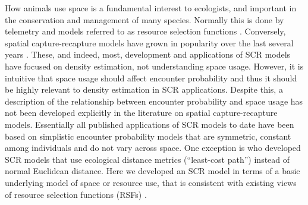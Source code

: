 \documentclass[12pt]{article}
\begin{document}
How animals use space is a fundamental interest to ecologists, and
important in the conservation and management of many species.
Normally this is done
by telemetry and models referred to as resource selection functions
\citep{manly_etal:2002}.  Conversely, spatial capture-recapture models
have grown in popularity over the last several years
\citep{efford:2004,borchers_efford:2008, royle:2008,
  efford_etal:2009ecol,royle_etal:2009ecol, gardner_etal:2010ecol,
  gardner_etal:2010jwm, kery_etal:2010,
  sollmann_etal:2011,mollet_etal:2012,gopalaswamy_etal:2012}. These,
and indeed, most,
 development and applications of SCR models have focused on density
estimation, not understanding space usage.  However, it is intuitive that space
usage should affect encounter probability and thus it should be highly relevant
to density estimation in SCR applications. Despite this, a description
of the
relationship between encounter probability and space usage has not
been developed explicitly in the literature on spatial
capture-recapture models.  Essentially all
published applications of SCR models to date have been based on
simplistic encounter probability models that are symmetric, constant
among individuals and do not vary across space. One exception is
\citet{royle_etal:2012ecol} who developed SCR models that use
ecological distance metrics (``least-cost path'')
instead of normal Euclidean distance. Here
we developed an SCR model in terms of a basic underlying model of
space or resource use, that is consistent with existing views of
resource selection functions (RSFs) \citep{manly_etal:2002}.
\end{document}
